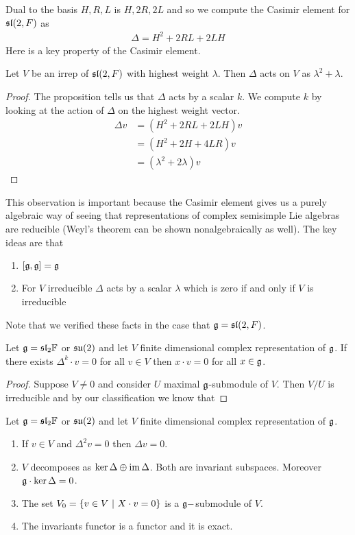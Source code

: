 \documentclass[12pt]{article}
\begin{document}
Dual to the basis $H,R,L$ is $H,2R,2L$ and so we compute the Casimir element for $\sl(2,F)$ as \begin{align*}
    \Delta = H^2 + 2RL + 2LH
\end{align*}
Here is a key property of the Casimir element.
\begin{lemma}
    Let $V$ be an irrep of $\sl(2,F)$ with highest weight $\lambda$. Then $\Delta$ acts on $V$ as $\lambda^2 + \lambda$.
\end{lemma}
\begin{proof}
    The proposition tells us that $\Delta$ acts by a scalar $k$. We compute $k$ by looking at the action of $\Delta$ on the highest weight vector.
    \begin{align*}
        \Delta v &= (H^2 + 2RL + 2LH)v \\
        &= (H^2 + 2H + 4LR)v \\
        &= (\lambda^2 + 2\lambda)v
    \end{align*}
\end{proof}
This observation is important because the Casimir element gives us a purely algebraic way of seeing
that representations of complex semisimple Lie algebras are reducible (Weyl's theorem can be shown nonalgebraically as well).
The key ideas are that \begin{enumerate}
    \item $[\mf g,\mf g] = \mf g$
    \item For $V$ irreducible $\Delta$ acts by a scalar $\lambda$ which is zero if and only if $V$ is irreducible
\end{enumerate}

Note that we verified these facts in the case that $\mf g = \sl(2,F)$.

\begin{proposition}
    Let $\mf g = \sl_2\F$ or $\su(2)$ and let $V$ finite dimensional complex representation of $\mf g$.
    If there exists $\Delta^k \cdot v = 0$ for all $v\in V$ then $x\cdot v = 0$ for all $x\in\mf g$.
\end{proposition}
\begin{proof}
    Suppose $V\neq 0$ and consider $U$ maximal $\mf g$-submodule of $V$. Then $V/U$ is irreducible 
    and by our classification we know that 
\end{proof}

\begin{proposition}
    Let $\mf g = \sl_2\F$ or $\su(2)$ and let $V$ finite dimensional complex representation of $\mf g$.
    \begin{enumerate}
        \item If $v\in V$ and $\Delta^2v = 0$ then $\Delta v = 0$.
        \item $V$ decomposes as $\ker\Delta\oplus \im\Delta$. Both are invariant subspaces. Moreover $\mf g\cdot \ker\Delta = 0$.
        \item The set $V_0 = \set{v\in V\st X\cdot v = 0}$ is a $\mf g-$submodule of $V$.
        \item The invariants functor is a functor and it is exact.
    \end{enumerate}
\end{proposition}
\end{document}
